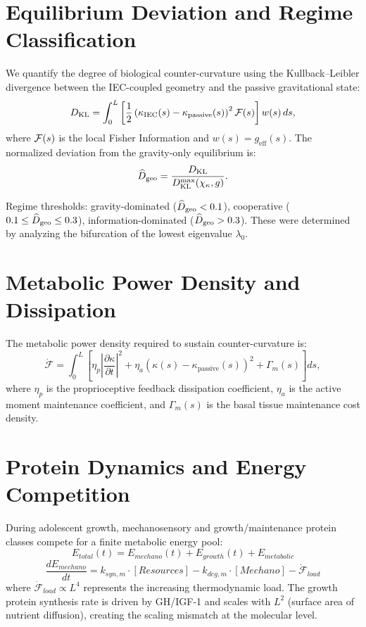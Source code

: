 \section{Equilibrium Deviation and Regime Classification}

We quantify the degree of biological counter-curvature using the Kullback--Leibler divergence between the IEC-coupled geometry and the passive gravitational state:
\begin{equation}
D_{\mathrm{KL}} = \int_0^L \left[ \frac{1}{2} \left( \kappa_{\mathrm{IEC}}(s) - \kappa_{\mathrm{passive}}(s) \right)^2 \mathcal{F}(s) \right] w(s)\, ds,
\end{equation}
where $\mathcal{F}(s)$ is the local Fisher Information and $w(s) = g_{\mathrm{eff}}(s)$. The normalized deviation from the gravity-only equilibrium is:
\begin{equation}
\widehat{D}_{\mathrm{geo}} = \frac{D_{\mathrm{KL}}}{D_{\mathrm{KL}}^{\mathrm{max}}(\chi_\kappa, g)}.
\end{equation}

Regime thresholds: gravity-dominated ($\widehat{D}_{\mathrm{geo}} < 0.1$), cooperative ($0.1 \leq \widehat{D}_{\mathrm{geo}} \leq 0.3$), information-dominated ($\widehat{D}_{\mathrm{geo}} > 0.3$). These were determined by analyzing the bifurcation of the lowest eigenvalue $\lambda_0$.

\section{Metabolic Power Density and Dissipation}

The metabolic power density required to sustain counter-curvature is:
\begin{equation}
\dot{\mathcal{F}} = \int_0^L \left[ \eta_p \left|\frac{\partial \kappa}{\partial t}\right|^2 + \eta_a \left(\kappa(s) - \kappa_{\mathrm{passive}}(s)\right)^2 + \Gamma_m(s) \right] ds,
\end{equation}
where $\eta_p$ is the proprioceptive feedback dissipation coefficient, $\eta_a$ is the active moment maintenance coefficient, and $\Gamma_m(s)$ is the basal tissue maintenance cost density.

\section{Protein Dynamics and Energy Competition}

During adolescent growth, mechanosensory and growth/maintenance protein classes compete for a finite metabolic energy pool:
\begin{equation}
E_{total}(t) = E_{mechano}(t) + E_{growth}(t) + E_{metabolic}
\end{equation}
\begin{equation}
\frac{dE_{mechano}}{dt} = k_{syn,m} \cdot [Resources] - k_{deg,m} \cdot [Mechano] - \dot{\mathcal{F}}_{load}
\end{equation}
where $\dot{\mathcal{F}}_{load} \propto L^4$ represents the increasing thermodynamic load. The growth protein synthesis rate is driven by GH/IGF-1 and scales with $L^2$ (surface area of nutrient diffusion), creating the scaling mismatch at the molecular level.

